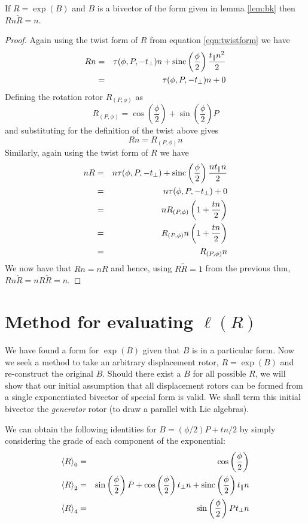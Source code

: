 \begin{thm} If $R = \exp(B)$ and $B$ is a bivector of the form 
given in lemma
\ref{lem:bk} then $Rn\tilde{R} = n$.
\end{thm}
\begin{proof}
Again using the twist form of $R$ from equation \ref{eqn:twistform} we have
\begin{eqnarray*}
Rn & = & \tau(\phi, P, - t_\perp)n + 
\mathrm{sinc}\left(\frac{\phi}{2}\right)\frac{t_\parallel n^2}{2} \\
&=& \tau(\phi, P, - t_\perp)n + 0
\end{eqnarray*}
Defining the rotation rotor $R_{(P,\phi)}$ as
\[
R_{(P,\phi)} = \cos\left(\frac{\phi}{2}\right) +
   \sin\left(\frac{\phi}{2}\right)P
\]
and substituting for the definition of the twist above gives
\[
Rn = R_{(P,\phi)} n
\]
Similarly, again using the twist form of $R$ we have
\begin{eqnarray*}
nR & = & n\tau(\phi, P, - t_\perp) + 
\mathrm{sinc}\left(\frac{\phi}{2}\right)\frac{nt_\parallel n}{2} \\
&=& n\tau(\phi, P, - t_\perp) + 0 \\
&=& n R_{(P,\phi)} \left( 1 + \frac{tn}{2} \right) \\
&=& R_{(P,\phi)} n \left( 1 + \frac{tn}{2} \right) \\
&=& R_{(P,\phi)} n 
\end{eqnarray*}
We now have that $Rn = nR$ and hence, using
$R\tilde{R} = 1$ from the previous thm, 
$Rn\tilde{R} = nR\tilde{R} = n$.
\end{proof}

\section{Method for evaluating $\ell(R)$}

We have found a form for $\exp(B)$ given that $B$ is in a particular form.
Now we seek a method to take an arbitrary displacement
rotor, $R = \exp(B)$ and re-construct the original $B$. Should there exist
a $B$ for all possible $R$, we will show that our initial assumption
that all displacement rotors can be formed from a single exponentiated bivector
of special form is valid. We shall term this initial bivector
the \emph{generator} rotor (to draw a parallel with Lie algebras).

We can obtain the following identities for $B=(\phi / 2) P + tn / 2$ by simply considering
the grade of each component of the exponential:
\begin{eqnarray*}
\left< R \right>_0 & = & \cos\left(\frac{\phi}{2}\right) \\
\left< R \right>_2 & = & \sin\left(\frac{\phi}{2}\right) P + 
  \cos\left(\frac{\phi}{2}\right) t_\perp n + \mathrm{sinc}\left(\frac{\phi}{2}\right) t_\parallel n \\
\left< R \right>_4 & = & \sin\left(\frac{\phi}{2}\right) Pt_\perp n
\end{eqnarray*}

